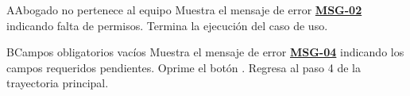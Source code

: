 \begin{UCtrayectoriaA}{A}{Abogado no pertenece al equipo}
	\UCpaso Muestra el mensaje de error \hyperlink{mMSG02}{\bf MSG-02} indicando falta de permisos.
	\UCpaso Termina la ejecución del caso de uso.
\end{UCtrayectoriaA}

\begin{UCtrayectoriaA}{B}{Campos obligatorios vacíos}
	\UCpaso Muestra el mensaje de error \hyperlink{mMSG04}{\bf MSG-04} indicando los campos requeridos pendientes.
	\UCpaso[\UCactor] Oprime el botón .
	\UCpaso Regresa al paso 4 de la trayectoria principal.
\end{UCtrayectoriaA}

